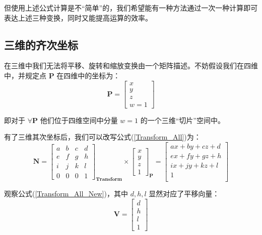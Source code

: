\documentclass[12pt,oneside,a4paper]{ctexart}
\begin{document}
但使用上述公式计算是不“简单”的，我们希望能有一种方法通过一次一种计算即可表达上述三种变换，同时又能提高运算的效率。
\subsection{三维的齐次坐标}
在三维中我们无法将平移、旋转和缩放变换由一个矩阵描述。不妨假设我们在四维中，并规定点 $\mathbf{P}$ 在四维中的坐标为：
\begin{equation*}
	\mathbf{P}=
	\begin{bmatrix}
		x \\
		y \\
		z \\
		w=1
	\end{bmatrix}
\end{equation*}

即对于 $\forall{}\mathbf{P}$ 他们位于四维空间中分量 $w=1$ 的一个三维“切片”空间中。

有了三维其次坐标后，我们可以改写公式(\ref{Transform_All})为：
\begin{equation}
	\mathbf{N} =
	\begin{bmatrix}
		a & b & c & d \\
		e & f & g & h \\
		i & j & k & l \\
		0 & 0 & 0 & 1
	\end{bmatrix}_{\mathbf{Transform}}
	\times
	\begin{bmatrix}
		x \\
		y \\
		z \\
		1
	\end{bmatrix}_{\mathbf{P}}
	=
	\begin{bmatrix}
		ax+by+cz+d \\
		ex+fy+gz+h \\
		ix+jy+kz+l \\
		1          \\
	\end{bmatrix}
	\label{Transform_All_New}
\end{equation}

观察公式(\ref{Transform_All_New})，其中 $d, h, l$ 显然对应了平移向量：
\begin{equation*}
	\mathbf{V}=
	\begin{bmatrix}
		d \\
		h \\
		l \\
		1
	\end{bmatrix}
\end{equation*}
\end{document}
